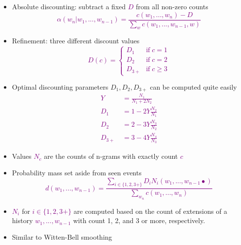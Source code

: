 \documentclass[landscape]{slides}
\newcommand{\maths}[1]{\textcolor{purple}{#1}}
\begin{document}

\begin{itemize}
\item Absolute discounting: subtract a fixed \maths{$D$} from all non-zero counts
\maths{\begin{equation*}
\alpha(w_n|w_1,...,w_{n-1}) = \frac{c(w_1,...,w_n)-D}{\sum_{w} c(w_1,...,w_{n-1},w)}
\end{equation*}}
\item Refinement: three different discount values
\maths{\begin{equation*}
D(c) = 
\begin{cases}
D_1 & \text{if} \; c=1\\
D_2 & \text{if} \; c=2\\
D_{3+} & \text{if} \; c \ge 3
\end{cases}
\end{equation*}}
\end{itemize}


\begin{itemize}
\item Optimal discounting parameters $D_1,D_2,D_{3+}$ can be computed quite easily
\maths{\begin{equation*}
\begin{split}
Y \;&= \frac{N_1}{N_1 + 2 N_2}\\
D_1 \;&= 1-2Y\frac{N_2}{N_1}\\
D_2 \;&= 2-3Y\frac{N_3}{N_2}\\
D_{3+} \;&= 3-4Y\frac{N_4}{N_3}
\end{split}
\label{eqn:lm:modified-kneser-ney-absolute-discounts}
\end{equation*}}
\vspace{-12mm}
\item Values \maths{$N_c$} are the counts of n-grams with exactly count \maths{$c$}
\end{itemize}


\vspace{15mm}
\begin{itemize}
\item Probability mass set aside from seen events
\maths{\begin{equation*}
d(w_1,...,w_{n-1}) = \frac{\sum_{i\in\{1,2,3+\}}  D_i N_i(w_1,...,w_{n-1}\bullet)}{\sum_{w_n} c(w_1,...,w_n)}
\end{equation*}}
\item \maths{$N_i$} for \maths{$i\in\{1,2,3+\}$} are computed based on the count of extensions of a history \maths{$w_1,...,w_{n-1}$} with count 1, 2, and 3 or more, respectively.
\item Similar to Witten-Bell smoothing
\end{itemize}
\end{document}
